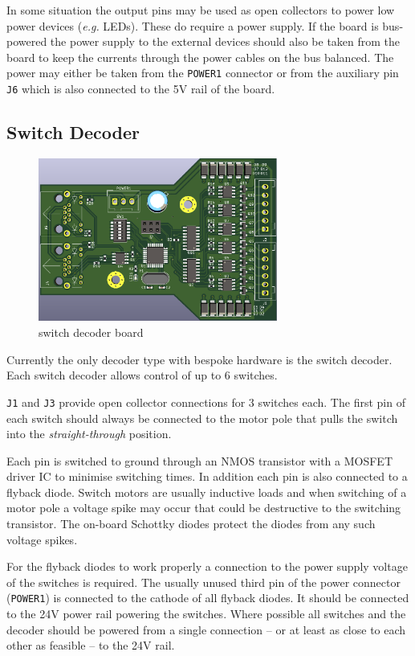 \documentclass{scrreprt}
\begin{document}
In some situation the output pins may be used as open collectors to power low power devices (\emph{e.g.} LEDs).
These do require a power supply.
If the board is bus-powered the power supply to the external devices should also be taken from the board to keep the currents through the power cables on the bus balanced.
The power may either be taken from the \texttt{POWER1} connector or from the auxiliary pin \texttt{J6} which is also connected to the 5V rail of the board.

\pagebreak
\subsection{Switch Decoder}
\begin{figure}[h!]
    \centering
    \includegraphics[width=0.7\textwidth]{switch_decoder}
    \caption{switch decoder board}
\end{figure}

Currently the only decoder type with bespoke hardware is the switch decoder.
Each switch decoder allows control of up to 6 switches.

\texttt{J1} and \texttt{J3} provide open collector connections for 3 switches each.
The first pin of each switch should always be connected to the motor pole that pulls the switch into the \emph{straight-through} position.

Each pin is switched to ground through an NMOS transistor with a MOSFET driver IC to minimise switching times.
In addition each pin is also connected to a flyback diode.
Switch motors are usually inductive loads and when switching of a motor pole a voltage spike may occur that could be destructive to the switching transistor.
The on-board Schottky diodes protect the diodes from any such voltage spikes.

For the flyback diodes to work properly a connection to the power supply voltage of the switches is required.
The usually unused third pin of the power connector (\texttt{POWER1}) is connected to the cathode of all flyback diodes.
It should be connected to the 24V power rail powering the switches.
Where possible all switches and the decoder should be powered from a single connection -- or at least as close to each other as feasible -- to the 24V rail.
\end{document}
